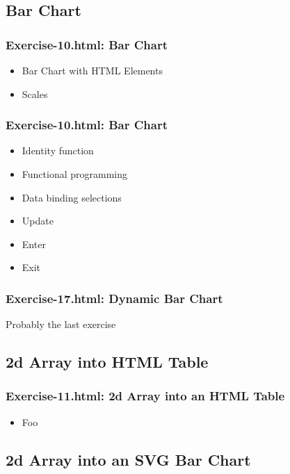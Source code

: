 \documentclass{beamer}
\begin{document}
\subsection{Bar Chart}


\begin{frame}
    \frametitle{Exercise-10.html: Bar Chart}
    \begin{itemize}
    \item Bar Chart with HTML Elements
    \item Scales
    \end{itemize}
\end{frame}



\begin{frame}
    \frametitle{Exercise-10.html: Bar Chart}
    \begin{itemize}
    \item Identity function
    \item Functional programming
    \item Data binding selections
    \item Update
    \item Enter
    \item Exit
    \end{itemize}
\end{frame}



\begin{frame}
    \frametitle{Exercise-17.html: Dynamic Bar Chart}
Probably the last exercise
\end{frame}



\subsection{2d Array into HTML Table}

\begin{frame}
    \frametitle{Exercise-11.html: 2d Array into an HTML Table}
    \begin{itemize}
    \item Foo
    \end{itemize}
\end{frame}



\subsection{2d Array into an SVG Bar Chart}
\end{document}
